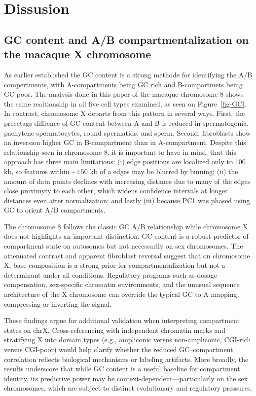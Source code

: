 \documentclass[
  a4paper,
  openany]{scrbook}
\begin{document}
\chapter{Dissusion}\label{dissusion}

\section{GC content and A/B compartmentalization on the macaque X
chromosome}\label{gc-content-and-ab-compartmentalization-on-the-macaque-x-chromosome}

As earlier established the GC content is a strong methode for
identifying the A/B compertments, with A-compartments being GC rich and
B-compartmets being GC poor. The analysis done in this paper of the
macaque chromosome 8 shows the same realtionship in all five cell types
examined, as seen on Figure~\ref{fig-GC}. In contrast, chromosome X
departs from this pattern in several ways. First, the precetags
diffrence of GC content between A and B is reduced in spermatogonia,
pachytene spermatocytes, round spermatids, and sperm. Second,
fibroblasts show an inversion higher GC in B-compartment than in
A-compartment. Despite this relationship seen in chromosome 8, it is
important to have in mind, that this approach has three main
limitations: (i) edge positions are localized only to 100 kb, so
features within \textasciitilde±50 kb of a edges may be blurred by
binning; (ii) the amount of data points declines with increasing
distance due to many of the edges close proximyty to each other, which
widens confidence intervals at longer distances even after
normalization; and lastly (iii) because PC1 was phased using GC to
orient A/B compartments.

The chromosome 8 follows the classic GC A/B relationship while
chromosome X does not highlights an important distinction: GC content is
a robust predictor of compartment state on autosomes but not necessarily
on sex chromosomes. The attenuated contrast and apparent fibroblast
reversal suggest that on chromosome X, base composition is a strong
prior for compartmentalization but not a determinant under all
conditions. Regulatory programs such as dosage compensation,
sex-specific chromatin environments, and the unusual sequence
architecture of the X chromosome can override the typical GC to A
mapping, compressing or inverting the signal.

These findings argue for additional validation when interpreting
compartment states on chrX. Cross-referencing with independent chromatin
marks and stratifying X into domain types (e.g., ampliconic versus
non-ampliconic, CGI-rich versus CGI-poor) would help clarify whether the
reduced GC--compartment correlation reflects biological mechanisms or
labeling artifacts. More broadly, the results underscore that while GC
content is a useful baseline for compartment identity, its predictive
power may be context-dependent---particularly on the sex chromosomes,
which are subject to distinct evolutionary and regulatory pressures.
\end{document}
